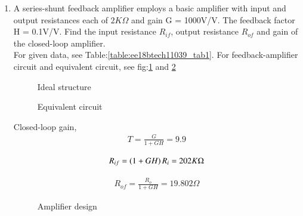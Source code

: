 \begin{enumerate}[label=\thesubsection.\arabic*.,ref=\thesubsection.\theenumi]

    \item A series-shunt feedback amplifier employs a basic amplifier with input and output resistances each of $2K\Omega$ and
    gain G = 1000V/V. The feedback factor H = 0.1V/V. Find the input resistance $R_{if}$, output resistance $R_{of}$ and gain 
    of the closed-loop amplifier. \\
    
\solution 
For given data, see Table:\ref{table:ee18btech11039_tab1}.
For feedback-amplifier circuit and equivalent circuit, see fig:\ref{fig:ee18btech11039_fig1} and \ref{fig:ee18btech11039_fig2}

\begin{table}[!h]
\centering

\caption{}
\label{table:ee18btech11039_tab1}
\end{table}

\begin{figure}[!h]
		\resizebox{\columnwidth}{!}{}
\caption{Ideal structure}
\label{fig:ee18btech11039_fig1}
\end{figure}

\begin{figure}[!h]
		\resizebox{\columnwidth}{!}{}
\caption{Equivalent circuit}
\label{fig:ee18btech11039_fig2}
\end{figure}

Closed-loop gain,
\begin{align}
    T = \frac{G}{1+GH}
      = 9.9
\end{align}

\begin{align}
    R_{if} = \left(1+GH\right) R_i
    = 202K\Omega
\end{align}

\begin{align}
    R_{of} = \frac{R_o}{1+GH}
           = 19.802\Omega
\end{align}

\begin{figure}[!h]
		\resizebox{\columnwidth}{!}{}
\caption{Amplifier design}
\label{fig:ee18btech11039_fig3}
\end{figure}


\end{enumerate}
